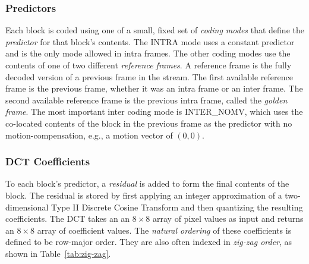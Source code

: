 \documentclass[11pt,letterpaper]{article}
\newcommand{\term}[1]{{\em #1}}
\begin{document}
\subsubsection{Predictors}

Each block is coded using one of a small, fixed set of \term{coding modes} that
 define the \term{predictor} for that block's contents.
The INTRA mode uses a constant predictor and is the only mode allowed in intra
 frames.
The other coding modes use the contents of one of two different \term{reference
 frames}.
A reference frame is the fully decoded version of a previous frame in the
 stream.
The first available reference frame is the previous frame, whether it was an
 intra frame or an inter frame.
The second available reference frame is the previous intra frame, called the
 \term{golden frame}.
The most important inter coding mode is INTER\_NOMV, which uses the co-located
 contents of the block in the previous frame as the predictor with no
 motion-compensation, e.g., a motion vector of $(0,0)$.

\subsubsection{DCT Coefficients}

To each block's predictor, a \term{residual} is added to form the final
 contents of the block.
The residual is stored by first applying an integer approximation of a
 two-dimensional Type II Discrete Cosine Transform and then quantizing the
 resulting coefficients.
The DCT takes an an $8\times 8$ array of pixel values as input and returns an
 $8\times 8$ array of coefficient values.
The \term{natural ordering} of these coefficients is defined to be row-major
 order.
They are also often indexed in \term{zig-zag order}, as shown in
 Table~\ref{tab:zig-zag}.
\end{document}
